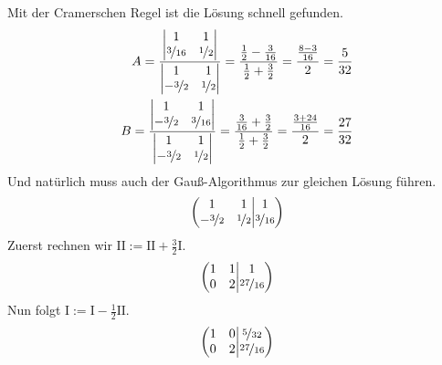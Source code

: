 \documentclass[11pt,a4paper,DIV=12]{scrartcl}
\begin{document}
%
Mit der Cramerschen Regel ist die Lösung schnell gefunden.
%
\begin{align}
	A =
	\frac{
		\begin{vmatrix}
			1 & 1\\
			\nicefrac{3}{16} & \nicefrac{1}{2}
		\end{vmatrix}
	}
	{
		\begin{vmatrix}
			1 & 1\\
			-\nicefrac{3}{2} & \nicefrac{1}{2}
	\end{vmatrix}
	}
	=\frac{\frac{1}{2}-\frac{3}{16}}{\frac{1}{2}+\frac{3}{2}}=\frac{\frac{8-3}{16}}{2}=\frac{5}{32}\\
	B=
	\frac{
		\begin{vmatrix}
			1 &  1\\
			-\nicefrac{3}{2} & \nicefrac{3}{16}
		\end{vmatrix}
	}
	{
		\begin{vmatrix}
			1 & 1\\
			-\nicefrac{3}{2} & \nicefrac{1}{2}
	\end{vmatrix}
	}
	=\frac{\frac{3}{16}+\frac{3}{2}}{\frac{1}{2}+\frac{3}{2}}=\frac{\frac{3+24}{16}}{2}=\frac{27}{32}
\end{align}
%
%
%
Und natürlich muss auch der Gauß-Algorithmus zur gleichen Lösung führen.
%
%
\begin{gather}
	\left\lparen
	\begin{matrix}
		1 & 1 \\
		-\nicefrac{3}{2}&\nicefrac{1}{2}
	\end{matrix}
	\middle\vert
	\begin{matrix}
		1 \\
		\nicefrac{3}{16}
	\end{matrix}
	\right\rparen
\end{gather}
%
%
Zuerst rechnen wir $\mathrm{II}:=\mathrm{II}+\frac{3}{2}\mathrm{I}$.
%
%
\begin{gather}
	\left\lparen
	\begin{matrix}
		1 & 1 \\
		0&2
	\end{matrix}
	\middle\vert
	\begin{matrix}
		1 \\
		\nicefrac{27}{16}
	\end{matrix}
	\right\rparen
\end{gather}
%
%
Nun folgt $\mathrm{I}:=\mathrm{I}-\frac{1}{2}\mathrm{II}$.
%
%
\begin{gather}
	\left\lparen
	\begin{matrix}
		1 & 0 \\
		0&2
	\end{matrix}
	\middle\vert
	\begin{matrix}
		\nicefrac{5}{32} \\
		\nicefrac{27}{16}
	\end{matrix}
	\right\rparen
\end{gather}
\end{document}
